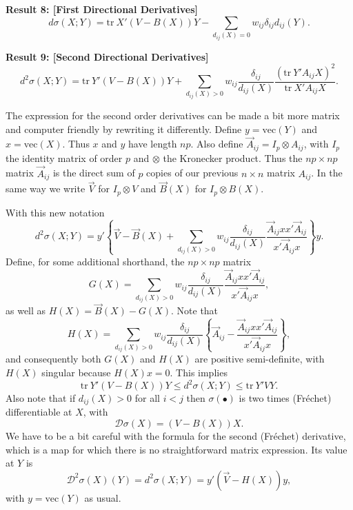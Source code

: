 \documentclass[12pt,]{article}
\begin{document}
\textbf{Result 8: {[}First Directional Derivatives{]}} \begin{equation}
d\sigma(X;Y)=
\text{tr}\ X'(V-B(X))Y-\sum_{d_{ij}(X)=0}w_{ij}\delta_{ij}d_{ij}(Y).
\end{equation}

\textbf{Result 9: {[}Second Directional Derivatives{]}} \begin{equation}
d^2\sigma(X;Y)=
\text{tr}\ Y'(V-B(X))Y+\sum_{d_{ij}(X)>0}w_{ij}\frac{\delta_{ij}}{d_{ij}(X)}\frac{(\text{tr}\ Y'A_{ij}X)^2}{\text{tr}\ X'A_{ij}X}.
\end{equation}

The expression for the second order derivatives can be made a bit more
matrix and computer friendly by rewriting it differently. Define
\(y=\text{vec}(Y)\) and \(x=\text{vec}(X)\). Thus \(x\) and \(y\) have
length \(np\). Also define
\(\overrightarrow{A}_{ij}=I_p\otimes A_{ij}\), with \(I_p\) the identity
matrix of order \(p\) and \(\otimes\) the Kronecker product. Thus the
\(np\times np\) matrix \(\overrightarrow{A}_{ij}\) is the direct sum of
\(p\) copies of our previous \(n\times n\) matrix \(A_{ij}\). In the
same way we write \(\overrightarrow{V}\) for \(I_p\otimes V\) and
\(\overrightarrow{B}(X)\) for \(I_p\otimes B(X)\).

With this new notation \begin{equation}
d^2\sigma(X;Y)=y'\left\{\overrightarrow{V}-\overrightarrow{B}(X)+\mathop{\sum}_{d_{ij}(X)>0}w_{ij}\frac{\delta_{ij}}{d_{ij}(X)}\frac{\overrightarrow{A}_{ij}xx'\overrightarrow{A}_{ij}}{x'\overrightarrow{A}_{ij}x}\right\}y.
\end{equation} Define, for some additional shorthand, the
\(np\times np\) matrix \[
G(X)=\sum_{d_{ij}(X)>0}w_{ij}\frac{\delta_{ij}}{d_{ij}(X)}\frac{\overrightarrow{A}_{ij}xx'\overrightarrow{A}_{ij}}{x'\overrightarrow{A}_{ij}x},
\] as well as \(H(X)=\overrightarrow{B}(X)-G(X)\). Note that \[
H(X)=\sum_{d_{ij}(X)>0}w_{ij}\frac{\delta_{ij}}{d_{ij}(X)}\left\{\overrightarrow{A}_{ij}-\frac{\overrightarrow{A}_{ij}xx'\overrightarrow{A}_{ij}}{x'\overrightarrow{A}_{ij}x}\right\},
\] and consequently both \(G(X)\) and \(H(X)\) are positive
semi-definite, with \(H(X)\) singular because \(H(X)x=0\). This implies
\[
\text{tr}\ Y'(V-B(X))Y\leq d^2\sigma(X;Y)\leq\text{tr}\ Y'VY.
\] Also note that if \(d_{ij}(X)>0\) for all \(i<j\) then
\(\sigma(\bullet)\) is two times (Fréchet) differentiable at \(X\), with
\begin{equation}
\mathcal{D}\sigma(X)=(V-B(X))X.
\end{equation} We have to be a bit careful with the formula for the
second (Fréchet) derivative, which is a map for which there is no
straightforward matrix expression. Its value at \(Y\) is
\begin{equation}
\mathcal{D}^2\sigma(X)(Y)=d^2\sigma(X;Y)=y'(\overrightarrow{V}-H(X))y,
\end{equation} with \(y=\text{vec}(Y)\) as usual.
\end{document}
